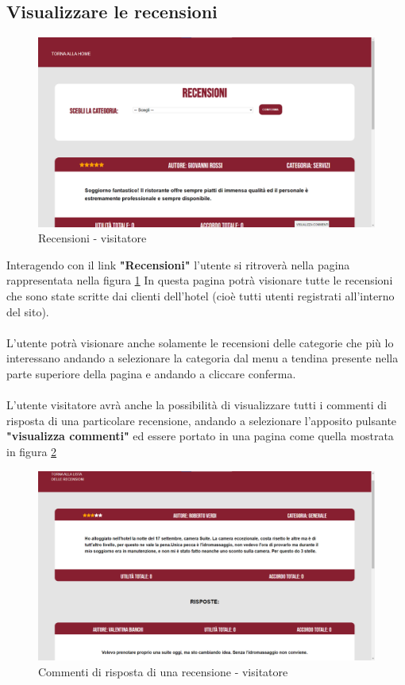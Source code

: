 \documentclass [a4paper, 12pt]{book}
\begin{document}
\subsection{Visualizzare le recensioni}
\begin{figure}[h]
\centering
\includegraphics[scale=0.3]{RecensioniVisitatore.png}
\caption{Recensioni - visitatore}
\label{RecensioniVisitatore}
\end{figure}
Interagendo con il link \textbf{"Recensioni"} l'utente si ritroverà nella pagina rappresentata nella figura \ref{RecensioniVisitatore} In questa pagina potrà visionare  tutte le recensioni che sono state scritte dai clienti dell'hotel (cioè tutti utenti registrati all'interno del sito).\\\\
L'utente potrà visionare anche solamente le recensioni delle categorie che più lo interessano andando a selezionare la categoria dal menu a tendina presente nella parte superiore della pagina e andando a cliccare conferma.\\\\
L'utente visitatore avrà anche la possibilità di visualizzare tutti i commenti di risposta di una particolare recensione, andando a selezionare l'apposito pulsante \textbf{"visualizza commenti"} ed essere portato in una pagina come quella mostrata in figura \ref{RisposteRecensioneVisitatore} \newpage
\begin{figure}[h]
\centering
\includegraphics[scale=0.3]{RisposteRecensioneVisitatore.png}
\caption{Commenti di risposta di una recensione - visitatore}
\label{RisposteRecensioneVisitatore}
\end{figure}
\end{document}
